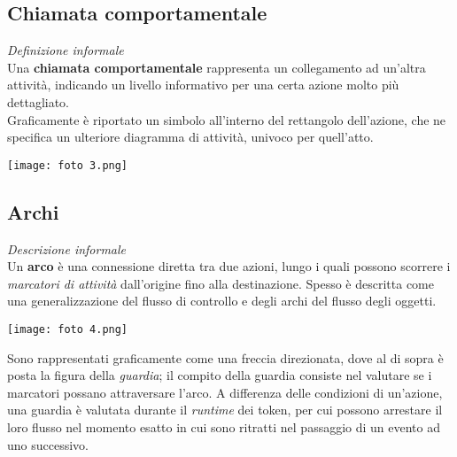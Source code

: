 \documentclass{article}
\begin{document}
\subsection*{Chiamata comportamentale}
\large
\textit{Definizione informale}\\Una \textbf{chiamata comportamentale} rappresenta un collegamento ad un'altra attività, indicando un livello informativo per una certa azione molto più dettagliato.\vspace*{14pt}\\
Graficamente è riportato un simbolo all'interno del rettangolo dell'azione, che ne specifica un ulteriore diagramma di attività, univoco per quell'atto.\\
\begin{center}
    \texttt{[image: foto 3.png]}
\end{center}

\subsection*{Archi}
\large
\textit{Descrizione informale}\\Un \textbf{arco} è una connessione diretta tra due azioni, lungo i quali possono scorrere i \textit{marcatori di attività} dall'origine fino alla destinazione. Spesso è descritta come una generalizzazione del flusso di controllo e degli archi del flusso degli oggetti.
\begin{center}
    \texttt{[image: foto 4.png]}
\end{center}
Sono rappresentati graficamente come una freccia direzionata, dove al di sopra è posta la figura della \textit{guardia}; il compito della guardia consiste nel valutare se i marcatori possano attraversare l'arco. A differenza delle condizioni di un'azione, una guardia è valutata durante il \textit{runtime} dei token, per cui possono arrestare il loro flusso nel momento esatto in cui sono ritratti nel passaggio di un evento ad uno successivo.
\end{document}
